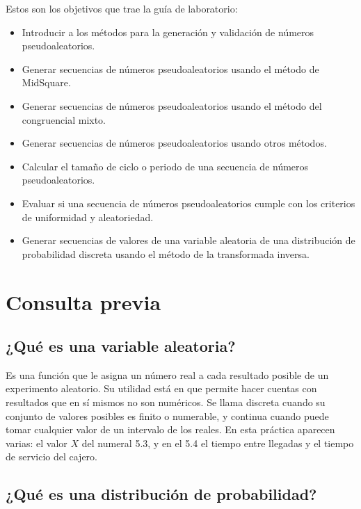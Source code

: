 \documentclass[11pt,letterpaper]{article}
\begin{document}
Estos son los objetivos que trae la guía de laboratorio:

\begin{itemize}[itemsep=2pt]
    \item Introducir a los métodos para la generación y validación de números pseudoaleatorios.
    \item Generar secuencias de números pseudoaleatorios usando el método de MidSquare.
    \item Generar secuencias de números pseudoaleatorios usando el método del congruencial mixto.
    \item Generar secuencias de números pseudoaleatorios usando otros métodos.
    \item Calcular el tamaño de ciclo o periodo de una secuencia de números pseudoaleatorios.
    \item Evaluar si una secuencia de números pseudoaleatorios cumple con los criterios de uniformidad y aleatoriedad.
    \item Generar secuencias de valores de una variable aleatoria de una distribución de probabilidad discreta usando el método de la transformada inversa.
\end{itemize}

\section{Consulta previa}

\subsection{¿Qué es una variable aleatoria?}

Es una función que le asigna un número real a cada resultado posible de un experimento aleatorio.
Su utilidad está en que permite hacer cuentas con resultados que en sí mismos no son numéricos. Se
llama discreta cuando su conjunto de valores posibles es finito o numerable, y continua cuando puede
tomar cualquier valor de un intervalo de los reales. En esta práctica aparecen varias: el valor $X$
del numeral 5.3, y en el 5.4 el tiempo entre llegadas y el tiempo de servicio del cajero.

\subsection{¿Qué es una distribución de probabilidad?}
\end{document}
